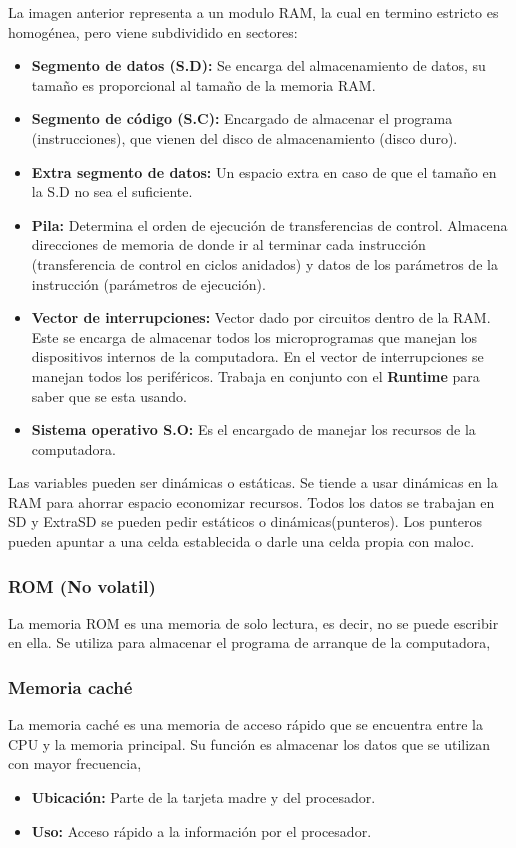 \documentclass{templateNote}
\begin{document}
\noindent La imagen anterior representa a un modulo RAM, la cual en termino estricto es homogénea, pero viene subdividido en sectores:
\begin{itemize}
    \item \textbf{Segmento de datos (S.D):} Se encarga del almacenamiento de datos, su tamaño es proporcional al tamaño de la memoria RAM.
    \item \textbf{Segmento de código (S.C):} Encargado de almacenar el programa (instrucciones), que vienen del disco de almacenamiento (disco duro).
    \item \textbf{Extra segmento de datos:} Un espacio extra en caso de que el tamaño en la S.D no sea el suficiente.
    \item \textbf{Pila:} Determina el orden de ejecución de transferencias de control. Almacena direcciones de memoria de donde ir al terminar cada instrucción 
    (transferencia de control en ciclos anidados) y datos de los parámetros de la instrucción (parámetros de ejecución).
    \item \textbf{Vector de interrupciones:} Vector dado por circuitos dentro de la RAM. Este se encarga de almacenar todos los microprogramas que manejan los 
    dispositivos internos de la computadora. En el vector de interrupciones se manejan todos los periféricos. Trabaja en conjunto con el \textbf{Runtime} 
    para saber que se esta usando.
    \item \textbf{Sistema operativo S.O:} Es el encargado de manejar los recursos de la computadora.
\end{itemize}
\noindent Las variables pueden ser dinámicas o estáticas. Se tiende a usar dinámicas en la RAM para ahorrar espacio economizar recursos. Todos los datos se trabajan en 
SD y ExtraSD se pueden pedir estáticos o dinámicas(punteros). Los punteros pueden apuntar a una celda establecida o darle una celda propia con maloc.

\subsubsection{ROM (No volatil)}
\noindent La memoria ROM es una memoria de solo lectura, es decir, no se puede escribir en ella. Se utiliza para almacenar el programa de arranque de la computadora,

\subsubsection{Memoria caché}
\noindent La memoria caché es una memoria de acceso rápido que se encuentra entre la CPU y la memoria principal. Su función es almacenar los datos que se utilizan con mayor frecuencia,
\begin{itemize}
    \item \textbf{Ubicación:} Parte de la tarjeta madre y del procesador.
    \item \textbf{Uso:} Acceso rápido a la información por el procesador.
\end{itemize}
\end{document}
